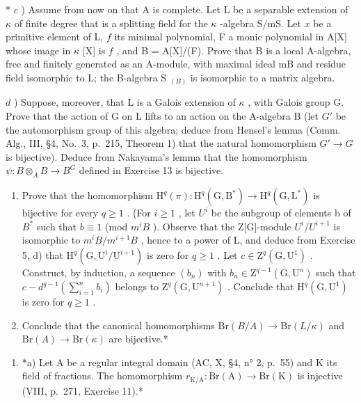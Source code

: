 * \(c\) ) Assume from now on that A is complete. Let L be a separable extension of \(\kappa\) of finite degree that is a splitting field for the \(\kappa\) -algebra S/mS. Let \(x\) be a primitive element of L, \(f\) its minimal polynomial, F a monic polynomial in A{[}X{]} whose image in \(\kappa\) {[}X{]} is \(f\) , and B = A{[}X{]}/(F). Prove that B is a local A-algebra, free and finitely generated as an A-module, with maximal ideal mB and residue field isomorphic to L; the B-algebra S \(_{(B)}\) is isomorphic to a matrix algebra.

\(d\) ) Suppose, moreover, that L is a Galois extension of \(\kappa\) , with Galois group G. Prove that the action of G on L lifts to an action on the A-algebra B (let \(G'\) be the automorphism group of this algebra; deduce from Hensel's lemma (Comm. Alg., III, §4, No.~3, p.~215, Theorem 1) that the natural homomorphism \(G' \to G\) is bijective). Deduce from Nakayama's lemma that the homomorphism \(\psi : B \otimes_A B \to B^G\) defined in Exercise 13 is bijective.

\begin{enumerate}
\def\labelenumi{\alph{enumi})}
\setcounter{enumi}{4}
\item
  Prove that the homomorphism \(\mathrm{H}^{q}(\pi):\mathrm{H}^{q}(\mathrm{G},\mathrm{B}^{*})\to\mathrm{H}^{q}(\mathrm{G},\mathrm{L}^{*})\) is bijective for every \(q\geqslant1\) . (For \(i\geqslant1\) , let \(U^{i}\) be the subgroup of elements b of \(B^{*}\) such that \(b\equiv1\) (mod \(m^{i}B\) ). Observe that the Z{[}G{]}-module \(U^{i}/U^{i+1}\) is isomorphic to \(m^{i}B/m^{i+1}B\) , hence to a power of L, and deduce from Exercise 5, d) that \(\mathrm{H}^{q}(\mathrm{G},\mathrm{U}^{i}/\mathrm{U}^{i+1})\) is zero for \(q\geqslant1\) . Let \(c\in\mathrm{Z}^{q}(\mathrm{G},\mathrm{U}^{1})\) . Construct, by induction, a sequence \((b_{n})\) with \(b_{n}\in\mathrm{Z}^{q-1}(\mathrm{G},\mathrm{U}^{n})\) such that \(c-d^{q-1}(\sum_{i=1}^{n}b_{i})\) belongs to \(\mathrm{Z}^{q}(\mathrm{G},\mathrm{U}^{n+1})\) . Conclude that \(\mathrm{H}^{q}(\mathrm{G},\mathrm{U}^{1})\) is zero for \(q\geqslant1\) .
\item
  Conclude that the canonical homomorphisms \(\mathrm{Br}(B/A)\to \mathrm{Br}(L/\kappa)\) and \(\mathrm{Br}(A)\to \mathrm{Br}(\kappa)\) are bijective.*
\end{enumerate}

\begin{enumerate}
\def\labelenumi{\arabic{enumi})}
\setcounter{enumi}{14}
\tightlist
\item
  *a) Let A be a regular integral domain (AC, X, §4, n° 2, p.~55) and K its field of fractions. The homomorphism \(r_{\mathrm{K / A}}: \mathrm{Br(A)} \to \mathrm{Br(K)}\) is injective (VIII, p.~271, Exercise 11).*
\end{enumerate}

